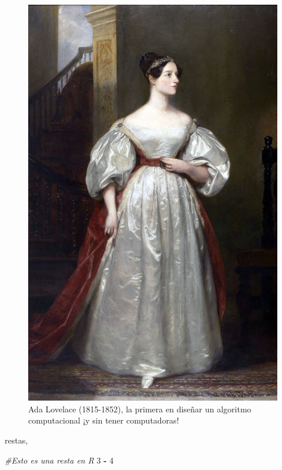 \documentclass[
]{book}
\newenvironment{Shaded}{\begin{snugshade}}{\end{snugshade}}
\newcommand{\CommentTok}[1]{\textcolor[rgb]{0.56,0.35,0.01}{\textit{#1}}}
\newcommand{\DecValTok}[1]{\textcolor[rgb]{0.00,0.00,0.81}{#1}}
\newcommand{\OperatorTok}[1]{\textcolor[rgb]{0.81,0.36,0.00}{\textbf{#1}}}
\newcommand{\StringTok}[1]{\textcolor[rgb]{0.31,0.60,0.02}{#1}}
\begin{document}
\begin{figure}

{\centering \includegraphics[width=14.22in]{images/ada_lovelace} 

}

\caption{Ada Lovelace (1815-1852), la primera en diseñar un algoritmo computacional ¡y sin tener computadoras!}\label{fig:unnamed-chunk-22}
\end{figure}

restas,

\begin{Shaded}
\begin{Highlighting}[]
\CommentTok{#Esto es una resta en R}
\DecValTok{3} \OperatorTok{-}\StringTok{ }\DecValTok{4}
\end{Highlighting}
\end{Shaded}
\end{document}
